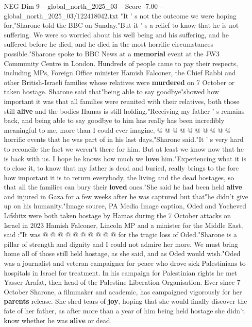 \begin{textsample}{NEG Dim 9 – global\_north\_2025\_03 – Score -7.00 – global\_north\_2025\_03/122418042.txt}  \label{ex:f9_neg_149}
"It ' s not the outcome we were hoping for,"Sharone told the BBC on Sunday."But it ' s a relief to know that he is not suffering.
We were so worried about his well being and his suffering, and he suffered before he died, and he died in the most horrific circumstances possible."Sharone spoke to BBC News at a \textbf{memorial} event at the JW3 Community Centre in London.
Hundreds of people came to pay their respects, including MPs, Foreign Office minister Hamish Falconer, the Chief Rabbi and other British-Israeli families whose relatives were \textbf{murdered} on 7 October or taken hostage.
Sharone said that"being able to say goodbye"showed how important it was that all families were reunited with their relatives, both those still \textbf{alive} and the bodies Hamas is still holding."Receiving my father ' s remains back, and being able to say goodbye to him has really has been incredibly meaningful to me, more than I could ever imagine, @ @ @ @ @ @ @ @ @ @ horrific events that he was part of in his last days,"Sharone said."It ' s very hard to reconcile the fact we weren't there for him.
But at least we know now that he is back with us.
I hope he knows how much we \textbf{love} him."Experiencing what it is to close it, to know that my father is dead and buried, really brings to the fore how important it is to return everybody, the living and the dead hostages, so that all the families can bury their \textbf{loved} ones."She said he had been held \textbf{alive} and injured in Gaza for a few weeks after he was captured but that"he didn't give up on his humanity."Image source, PA Media Image caption, Oded and Yocheved Lifshitz were both taken hostage by Hamas during the 7 October attacks on Israel in 2023 Hamish Falconer, Lincoln MP and a minister for the Middle East, said :"It was @ @ @ @ @ @ @ @ @ @ for the tragic loss of Oded."Sharone is a pillar of strength and dignity and I could not admire her more.
We must bring home all of those still held hostage, as she said, and as Oded would wish."Oded was a journalist and veteran campaigner for peace who drove sick Palestinians to hospitals in Israel for treatment.
In his campaign for Palestinian rights he met Yasser Arafat, then head of the Palestine Liberation Organisation.
Ever since 7 October Sharone, a filmmaker and academic, has campaigned vigorously for her \textbf{parents} release.
She shed tears of \textbf{joy}, hoping that she would finally discover the fate of her father, as after more than a year of him being held hostage she didn't know whether he was \textbf{alive} or dead.

\end{textsample}
